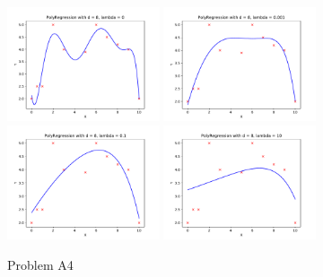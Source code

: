 \documentclass{article}
\newcommand{\1}{\mathbf{1}}
\begin{document}
    \begin{figure}[h!]
            \centering
            \includegraphics[width=0.4\textwidth]{hw1/code/Polynomial_Regression/figures/A4_l0.pdf}
            \includegraphics[width=0.4\textwidth]{hw1/code/Polynomial_Regression/figures/A4_l0001.pdf}
            \includegraphics[width=0.4\textwidth]{hw1/code/Polynomial_Regression/figures/A4_l01.pdf}
            \includegraphics[width=0.4\textwidth]{hw1/code/Polynomial_Regression/figures/A4_l10.pdf}
            \caption{Problem A4}
            \label{figure:a4}
    \end{figure}
\end{document}
